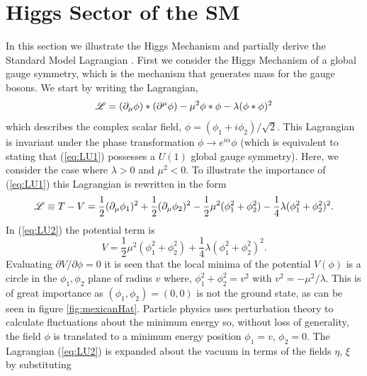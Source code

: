 \section{Higgs Sector of the SM}
In this section we illustrate the Higgs Mechanism and partially derive the
Standard Model Lagrangian \cite{Halzen:1984mc}. 
First we consider the Higgs Mechanism of a global gauge symmetry, 
which is the mechanism that generates mass for the gauge bosons. 
We start by writing the Lagrangian, 
\begin{equation}
\mathscr{L}=(\partial_{\mu}\phi)*(\partial^{\mu}\phi) - \mu^{2}\phi*\phi - \lambda (\phi*\phi)^{2}
\label{eq:LU1}
\end{equation}
which describes the complex scalar field, $\phi=(\phi_{1}+i\phi_{2})/\sqrt{2}$.
This Lagrangian is invariant under the phase transformation $\phi\rightarrow e^{i\alpha}\phi$
(which is equivalent to stating that (\ref{eq:LU1}) possesses a $U(1)$ global gauge symmetry).
Here, we consider the case where $\lambda>0$ and $\mu^{2}<0$. To illustrate the importance of (\ref{eq:LU1})
this Lagrangian is rewritten in the form
\begin{equation}
\mathscr{L} \equiv T-V = \frac{1}{2}(\partial_{\mu}\phi_{1})^{2}+\frac{1}{2}(\partial_{\mu}\phi_{2})^{2}-\frac{1}{2}\mu^{2}(\phi_{1}^{2}+\phi_{2}^{2})-\frac{1}{4}\lambda(\phi_{1}^{2}+\phi_{2}^{2})^{2}.
\label{eq:LU2}
\end{equation}
In (\ref{eq:LU2}) the potential term is
\begin{equation}
V=\frac{1}{2}\mu^{2}(\phi_{1}^{2}+\phi_{2}^{2})+\frac{1}{4}\lambda(\phi_{1}^{2}+\phi_{2}^{2})^{2}.
\end{equation}
Evaluating $\partial V/ \partial \phi = 0$ it is seen that the local minima
of the potential $V(\phi)$ is a circle in the $\phi_{1},\phi_{2}$ plane of radius $v$ where,
$\phi_{1}^{2}+\phi_{2}^{2}=v^{2}$ with $v^{2}= - \mu^{2}/\lambda$. This 
is of great importance as $(\phi_{1},\phi_{2})=(0,0)$ is not the ground state, as can be seen in figure \ref{fig:mexicanHat}.
Particle physics uses perturbation theory to calculate fluctuations 
about the minimum energy so, without loss of generality, the field $\phi$ is translated to a minimum
energy position $\phi_{1}=v$, $\phi_{2}=0$. The Lagrangian (\ref{eq:LU2}) is
expanded about the vacuum in terms of the fields $\eta$, $\xi$ by substituting
